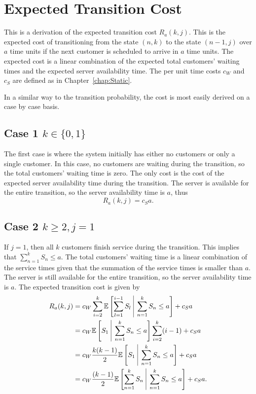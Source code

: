 \section{Expected Transition Cost}
This is a derivation of the expected transition cost $R_{a} (k, j)$. This is the expected cost of transitioning from the state $(n, k)$ to the state $(n - 1, j)$ over $a$ time units if the next customer is scheduled to arrive in $a$ time units. The expected cost is a linear combination of the expected total customers' waiting times and the expected server availability time. The per unit time costs $c_{W}$ and $c_{S}$ are defined as in Chapter~\ref{chap:Static}.

In a similar way to the transition probability, the cost is most easily derived on a case by case basis.

\subsection{Case 1 $k \in \{ 0, 1 \}$}
The first case is where the system initially has either no customers or only a single customer. In this case, no customers are waiting during the transition, so the total customers' waiting time is zero. The only cost is the cost of the expected server availability time during the transition. The server is available for the entire transition, so the server availability time is $a$, thus
\begin{equation}
	R_{a} (k, j) = c_{S} a.
\end{equation}

\subsection{Case 2 $k \geq 2, j = 1$}
If $j = 1$, then all $k$ customers finish service during the transition. This implies that $\displaystyle \sum_{n = 1}^{k} S_{n} \leq a$. The total customers' waiting time is a linear combination of the service times given that the summation of the service times is smaller than $a$. The server is still available for the entire transition, so the server availability time is $a$. The expected transition cost is given by
\begin{equation}
	\begin{split}
		R_{a} (k, j) & = c_{W} \sum_{i = 2}^{k} \mathbb{E} \left[ \sum_{l = 1}^{i - 1} S_{l} \ \vline \ \sum_{n = 1}^{k} S_{n} \leq a \right] + c_{S} a \\
		& = c_{W} \mathbb{E} \left[ S_{1} \ \vline \ \sum_{n = 1}^{k} S_{n} \leq a \right] \sum_{i = 2}^{k} (i - 1) + c_{S} a \\
		& = c_{W} \frac{k (k - 1)}{2} \mathbb{E} \left[ S_{1} \ \vline \ \sum_{n = 1}^{k} S_{n} \leq a \right] + c_{S} a \\
		& = c_{W} \frac{(k - 1)}{2} \mathbb{E} \left[ \sum_{n = 1}^{k} S_{n} \ \vline \ \sum_{n = 1}^{k} S_{n} \leq a \right] + c_{S} a.
	\end{split}
\end{equation}

